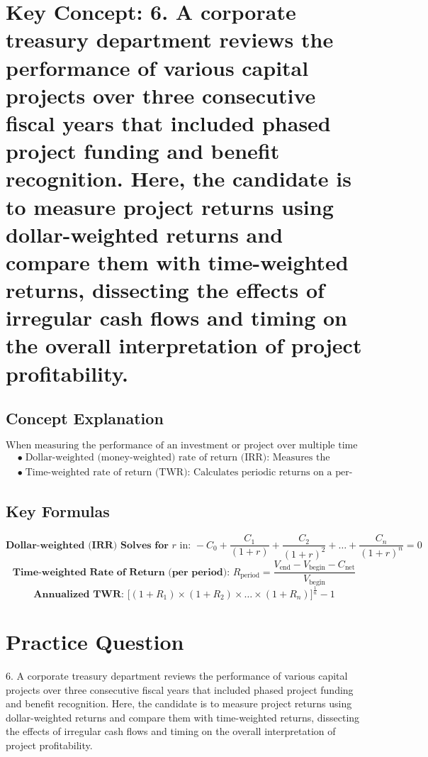 \section*{Key Concept: 6. A corporate treasury department reviews the performance of various capital projects over three consecutive fiscal years that included phased project funding and benefit recognition. Here, the candidate is to measure project returns using dollar-weighted returns and compare them with time-weighted returns, dissecting the effects of irregular cash flows and timing on the overall interpretation of project profitability.}

\subsection*{Concept Explanation}
\[
\text{When measuring the performance of an investment or project over multiple time periods with irregular contributions, two common methods are used:}
\]
\[
\begin{aligned}
&\bullet\; \text{Dollar-weighted (money-weighted) rate of return (IRR): Measures the internal rate of return that equates the present value of all cash inflows and outflows.}\\
&\bullet\; \text{Time-weighted rate of return (TWR): Calculates periodic returns on a per-period basis and then compounds them, eliminating the impact of the timing and magnitude of external cash flows.}
\end{aligned}
\]

\subsection*{Key Formulas}
\[
\textbf{Dollar-weighted (IRR) Solves for } r \text{ in: } 
- C_0 + \frac{C_1}{(1+r)} + \frac{C_2}{(1+r)^2} + \dots + \frac{C_n}{(1+r)^n} = 0
\]
\[
\textbf{Time-weighted Rate of Return (per period): }
R_{\mathrm{period}} = \frac{V_{\mathrm{end}} - V_{\mathrm{begin}} - C_{\mathrm{net}}}{V_{\mathrm{begin}}}
\]
\[
\textbf{Annualized TWR: } 
\bigl[ (1 + R_1) \times (1 + R_2)\times \dots \times (1 + R_n) \bigr]^{\frac{1}{n}} - 1
\]

\section*{Practice Question}
6. A corporate treasury department reviews the performance of various capital projects over three consecutive fiscal years that included phased project funding and benefit recognition. Here, the candidate is to measure project returns using dollar-weighted returns and compare them with time-weighted returns, dissecting the effects of irregular cash flows and timing on the overall interpretation of project profitability.

